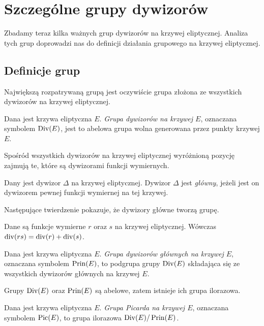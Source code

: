 \section{Szczególne grupy dywizorów}

Zbadamy teraz kilka ważnych grup dywizorów na krzywej eliptycznej.
Analiza tych grup doprowadzi nas do definicji
działania grupowego na krzywej eliptycznej.

\subsection*{Definicje grup}

Największą rozpatrywaną grupą jest oczywiście
grupa złożona ze wszystkich dywizorów na krzywej eliptycznej.

\begin{definition}
Dana jest krzywa eliptyczna $E$.
\emph{Grupa dywizorów na krzywej $E$},
oznaczana symbolem $\operatorname{Div}(E)$,
jest to abelowa grupa wolna generowana przez punkty krzywej $E$.
\end{definition}

Spośród wszystkich dywizorów na krzywej eliptycznej
wyróżnioną pozycję zajmują te,
które są dywizorami funkcji wymiernych.

\begin{definition}
Dany jest dywizor $\Delta$ na krzywej eliptycznej.
Dywizor $\Delta$ jest \emph{główny},
jeżeli jest on dywizorem pewnej funkcji wymiernej na tej krzywej.
\end{definition}

Następujące twierdzenie pokazuje, że dywizory główne tworzą grupę.

\begin{theorem}\label{fun_mul_divi_add_theorem}
Dane są funkcje wymierne $r$ oraz $s$ na krzywej eliptycznej.
Wówczas $\operatorname{div}(rs) = \operatorname{div}(r) + \operatorname{div}(s)$.
\end{theorem}

\begin{definition}
Dana jest krzywa eliptyczna $E$.
\emph{Grupa dywizorów głównych na krzywej $E$},
oznaczana symbolem $\operatorname{Prin}(E)$,
to podgrupa grupy $\operatorname{Div}(E)$
składająca się ze wszystkich dywizorów głównych na krzywej $E$.
\end{definition}

Grupy $\operatorname{Div}(E)$ oraz $\operatorname{Prin}(E)$ są abelowe,
zatem istnieje ich grupa ilorazowa.

\begin{definition}
Dana jest krzywa eliptyczna $E$.
\emph{Grupa Picarda na krzywej $E$},
oznaczana symbolem $\operatorname{Pic}(E)$,
to grupa ilorazowa $\operatorname{Div}(E)/\operatorname{Prin}(E)$.
\end{definition}

